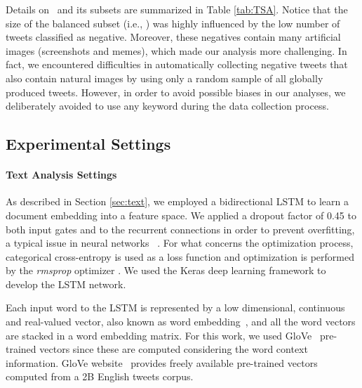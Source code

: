 Details on \TSA\, and its subsets are summarized in Table \ref{tab:TSA}.
Notice that the size of the balanced subset (i.e., {\BTSA}) was highly influenced by the low number of tweets classified as negative. Moreover, these negatives contain many artificial images (\eg screenshots and memes), which made our analysis more challenging.   %
In fact, we encountered difficulties in automatically collecting negative tweets that also contain natural images by using only a random sample of all globally produced tweets. However, in order to avoid possible biases in our analyses, we deliberately avoided to use any keyword during the data collection process.


%


\subsection{Experimental Settings}
\label{exp:visual} %
\paragraph{Text Analysis Settings}
As described in Section \ref{sec:text}, we employed a bidirectional LSTM to learn a document embedding into a feature space.  We  applied  a  dropout  factor of 0.45 to both input  gates and to the recurrent connections in order to prevent  overfitting,  a  typical  issue  in  neural networks ~\cite{gal2016theoretically}. For  what  concerns  the  optimization process, categorical cross-entropy is used as a loss function and optimization is performed by the \textit{rmsprop} optimizer \cite{tieleman2012lecture}. We used the Keras \cite{libkeras} deep learning framework to develop the LSTM network.

Each input word to the LSTM is represented by a low dimensional, continuous and real-valued vector, also known as word embedding~\cite{MikolovSCCD13}, and all the word vectors are stacked in a word embedding matrix. For this work, we used GloVe~\cite{pennington2014glove} pre-trained vectors since these are computed considering the word context information. GloVe website~ provides freely available pre-trained vectors computed from a 2B English tweets corpus.

